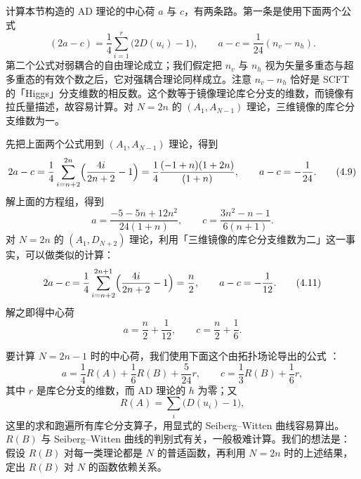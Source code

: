 计算本节构造的 AD 理论的中心荷 $a$ 与 $c$，有两条路。第一条是使用下面两个公式
\begin{equation}
(2a-c) = \frac{1}{4}\sum_{i=1}^{r}\bigl(2D(u_i)-1\bigr),\qquad
a-c = \frac{1}{24}(n_v - n_h).
\label{eq:4.8}\tag{4.8}
\end{equation}
第二个公式对弱耦合的自由理论成立；我们假定把 $n_v$ 与 $n_h$ 视为矢量多重态与超多重态的有效个数之后，它对强耦合理论同样成立。注意 $n_v-n_h$ 恰好是 SCFT 的「Higgs」分支维数的相反数。这个数等于镜像理论库仑分支的维数，而镜像有拉氏量描述，故容易计算。对 $N=2n$ 的 $(A_1,A_{N-1})$ 理论，三维镜像的库仑分支维数为一。

先把上面两个公式用到 $(A_1,A_{N-1})$ 理论，得到
\begin{equation}
2a-c = \frac{1}{4}\sum_{i=n+2}^{2n}\Bigl(\frac{4i}{2n+2}-1\Bigr)
= \frac{1}{4}\frac{(-1+n)(1+2n)}{(1+n)},\qquad
a-c = -\frac{1}{24}.
\label{eq:4.9}\tag{4.9}
\end{equation}
解上面的方程组，得到
\begin{equation}
a = \frac{-5-5n+12n^2}{24(1+n)},\qquad
c = \frac{3n^2-n-1}{6(n+1)}.
\label{eq:4.10}\tag{4.10}
\end{equation}
对 $N=2n$ 的 $(A_1,D_{N+2})$ 理论，利用「三维镜像的库仑分支维数为二」这一事实，可以做类似的计算：
\begin{equation}
2a-c = \frac{1}{4}\sum_{i=n+2}^{2n+1}\Bigl(\frac{4i}{2n+2}-1\Bigr) = \frac{n}{2},\qquad
a-c = -\frac{1}{12}.
\label{eq:4.11}\tag{4.11}
\end{equation}
解之即得中心荷
\begin{equation}
a = \frac{n}{2} + \frac{1}{12},\qquad c = \frac{n}{2} + \frac{1}{6}.
\label{eq:4.12}\tag{4.12}
\end{equation}

要计算 $N = 2n-1$ 时的中心荷，我们使用下面这个由拓扑场论导出的公式 \cite{20}：
\begin{equation}
a = \frac{1}{4}R(A) + \frac{1}{6}R(B) + \frac{5}{24}r,\qquad
c = \frac{1}{3}R(B) + \frac{1}{6}r,
\label{eq:4.13}\tag{4.13}
\end{equation}
其中 $r$ 是库仑分支的维数，而 AD 理论的 $h$ 为零；又
\begin{equation}
R(A) = \sum_{i}\bigl(D(u_i)-1\bigr),
\label{eq:4.14}\tag{4.14}
\end{equation}
这里的求和跑遍所有库仑分支算子，用显式的 Seiberg--Witten 曲线容易算出。$R(B)$ 与 Seiberg--Witten 曲线的判别式有关，一般极难计算。我们的想法是：假设 $R(B)$ 对每一类理论都是 $N$ 的普适函数，再利用 $N=2n$ 时的上述结果，定出 $R(B)$ 对 $N$ 的函数依赖关系。

